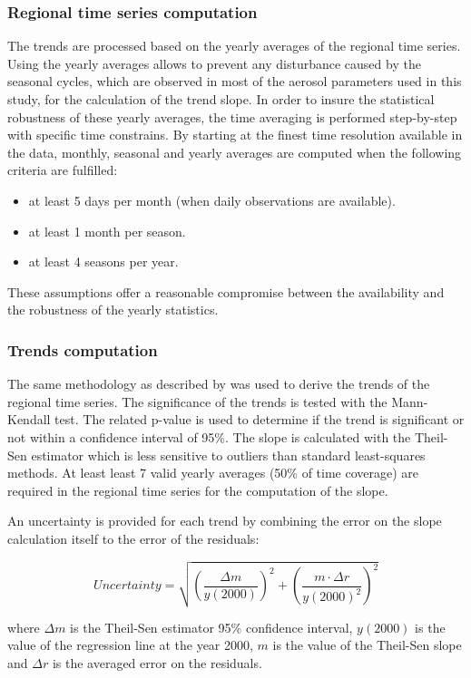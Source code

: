 \documentclass[journal abbreviation, manuscript]{copernicus}
\begin{document}
\subsubsection{Regional time series computation}
The trends are processed based on the yearly averages of the regional time series. Using the yearly averages allows to prevent any disturbance caused by the seasonal cycles, which are observed in most of the aerosol parameters used in this study, for the calculation of the trend slope. In order to insure the statistical robustness of these yearly averages, the time averaging is performed step-by-step with specific time constrains. By starting at the finest time resolution available in the data, monthly, seasonal and yearly averages are computed when the following criteria are fulfilled:
\begin{itemize}
 \item at least 5 days per month (when daily observations are available).
 \item at least 1 month per season.
 \item at least 4 seasons per year.
\end{itemize}
These assumptions offer a reasonable compromise between the availability and the robustness of the yearly statistics.

\subsubsection{Trends computation}
The same methodology as described by \cite{aas2019global} was used to derive the trends of the regional time series. The significance of the trends is tested with the Mann-Kendall test. The related p-value is used to determine if the trend is significant or not within a confidence interval of 95\%. The slope is calculated with the Theil-Sen estimator which is less sensitive to outliers than standard least-squares methods. At least least 7 valid yearly averages (50\% of time coverage) are required in the regional time series for the computation of the slope. 

An uncertainty is provided for each trend by combining the error on the slope calculation itself to the error of the residuals:

\begin{equation}
 Uncertainty = \sqrt{{\left (\frac{\Delta m}{y(2000)}\right )}^{2} + {\left ( \frac{m \cdot \Delta r}{y(2000)^2}\right )}^{2} }
\end{equation}

where $\Delta m$ is the Theil-Sen estimator 95\% confidence interval, $y(2000)$ is the value of the regression line at the year 2000, $m$ is the value of the Theil-Sen slope and $\Delta r$ is the averaged error on the residuals. 
\end{document}
